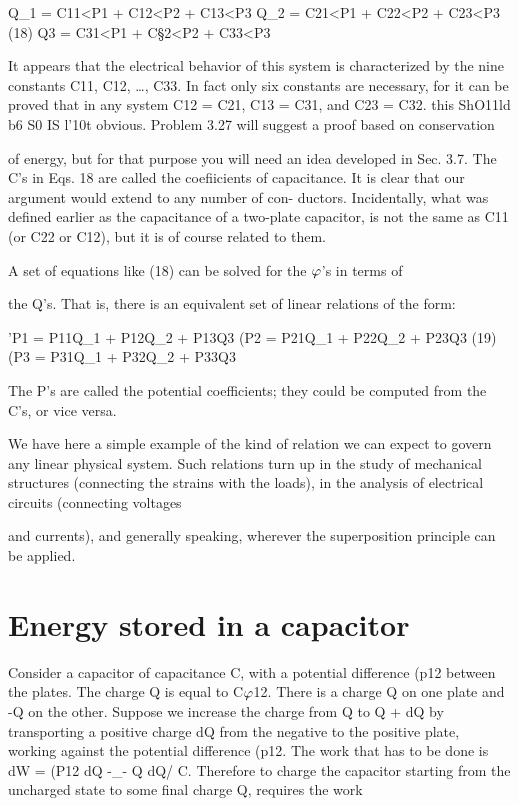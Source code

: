 Q_1 = C11<P1 + C12<P2 + C13<P3
Q_2 = C21<P1 + C22<P2 + C23<P3 (18)
Q3 = C31<P1 + C§2<P2 + C33<P3

It appears that the electrical behavior of this system is characterized
by the nine constants C11, C12, \ldots , C33. In fact only six constants
are necessary, for it can be proved that in any system
C12 = C21, C13 = C31, and C23 = C32.  this ShO11ld b6 S0 IS l'10t
obvious. Problem 3.27 will suggest a proof based on conservation

of energy, but for that purpose you will need an idea developed in
Sec. 3.7. The C's in Eqs. 18 are called the coefiicients of capacitance.
It is clear that our argument would extend to any number of con-
ductors. Incidentally, what was defined earlier as the capacitance
of a two-plate capacitor, is not the same as C11 (or C22 or C12), but
it is of course related to them.

A set of equations like (18) can be solved for the $\varphi$'s in terms of

the Q's. That is, there is an equivalent set of linear relations of the
form:

'P1 = P11Q_1 + P12Q_2 + P13Q3
(P2 = P21Q_1 + P22Q_2 + P23Q3 (19)
(P3 = P31Q_1 + P32Q_2 + P33Q3

The P's are called the potential coefficients; they could be computed
from the C's, or vice versa.

We have here a simple example of the kind of relation we can
expect to govern any linear physical system. Such relations turn up
in the study of mechanical structures (connecting the strains with
the loads), in the analysis of electrical circuits (connecting voltages

and currents), and generally speaking, wherever the superposition
principle can be applied.

\section{Energy stored in a capacitor}

Consider a capacitor of capacitance C, with a potential difference
(p12 between the plates. The charge Q is equal to C$\varphi$12. There is a
charge Q on one plate and -Q on the other. Suppose we increase
the charge from Q to Q + dQ by transporting a positive charge dQ
from the negative to the positive plate, working against the potential
difference (p12. The work that has to be done is dW = (P12 dQ -_-
Q dQ/ C. Therefore to charge the capacitor starting from the uncharged
state to some final charge Q, requires the work

